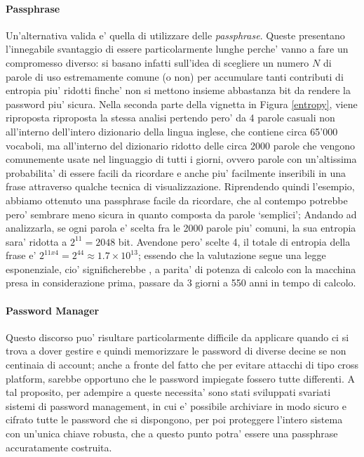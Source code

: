 \paragraph{Passphrase}
Un'alternativa valida e' quella di utilizzare delle \emph{passphrase}. Queste presentano l'innegabile svantaggio di essere particolarmente lunghe perche' vanno a fare un compromesso diverso: si basano infatti sull'idea di scegliere un numero $N$ di parole di uso estremamente comune (o non) per accumulare tanti contributi di entropia piu' ridotti finche' non si mettono insieme abbastanza bit da rendere la password piu' sicura. Nella seconda parte della vignetta in Figura \ref{entropy}, viene riproposta riproposta la stessa analisi pertendo pero' da 4 parole casuali non all'interno dell'intero dizionario della lingua inglese, che contiene circa 65'000 vocaboli, ma all'interno del dizionario ridotto delle circa 2000 parole che vengono comunemente usate nel linguaggio di tutti i giorni, ovvero parole con un'altissima probabilita' di essere facili da ricordare e anche piu' facilmente inseribili in una frase attraverso qualche tecnica di visualizzazione. Riprendendo quindi l'esempio, abbiamo ottenuto una passphrase facile da ricordare, che al contempo potrebbe pero' sembrare meno sicura in quanto composta da parole `semplici'; Andando ad analizzarla, se ogni parola e' scelta fra le 2000 parole piu' comuni, la sua entropia sara' ridotta a $2^{11} = 2048$ bit. Avendone pero' scelte 4, il totale di entropia della frase e' $2^{11x4} = 2^{44} \approx 1.7 \times 10^{13}$; essendo che la valutazione segue una legge esponenziale, cio' significherebbe , a parita' di potenza di calcolo con la macchina presa in considerazione prima, passare da 3 giorni a 550 anni in tempo di calcolo.

\paragraph{Password Manager}
Questo discorso puo' risultare particolarmente difficile da applicare quando ci si trova a dover gestire e quindi memorizzare le password di diverse decine se non centinaia di account; anche a fronte del fatto che per evitare attacchi di tipo cross platform, sarebbe opportuno che le password impiegate fossero tutte differenti. A tal proposito, per adempire a queste necessita' sono stati sviluppati svariati sistemi di password management, in cui e' possibile archiviare in modo sicuro e cifrato tutte le password che si dispongono, per poi proteggere l'intero sistema con un'unica chiave robusta, che a questo punto potra' essere una passphrase accuratamente costruita.

